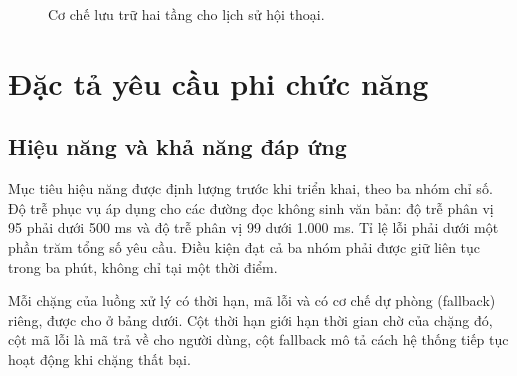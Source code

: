 \begin{figure}[htbp]
    \centering
    \caption{Cơ chế lưu trữ hai tầng cho lịch sử hội thoại.}
    \label{fig:luu-tru-hai-tang}
\end{figure}

\section{Đặc tả yêu cầu phi chức năng}
\label{sec:dac-ta-phi-chuc-nang}

\subsection{Hiệu năng và khả năng đáp ứng}
\label{subsec:hieu-nang}

Mục tiêu hiệu năng được định lượng trước khi triển khai, theo ba nhóm chỉ số. Độ trễ phục vụ áp dụng cho các đường đọc không sinh văn bản: độ trễ phân vị 95 phải dưới 500 ms và độ trễ phân vị 99 dưới 1.000 ms. Tỉ lệ lỗi phải dưới một phần trăm tổng số yêu cầu. Điều kiện đạt cả ba nhóm phải được giữ liên tục trong ba phút, không chỉ tại một thời điểm.

Mỗi chặng của luồng xử lý có thời hạn, mã lỗi và có cơ chế dự phòng (fallback) riêng, được cho ở bảng dưới. Cột thời hạn giới hạn thời gian chờ của chặng đó, cột mã lỗi là mã trả về cho người dùng, cột fallback mô tả cách hệ thống tiếp tục hoạt động khi chặng thất bại.


